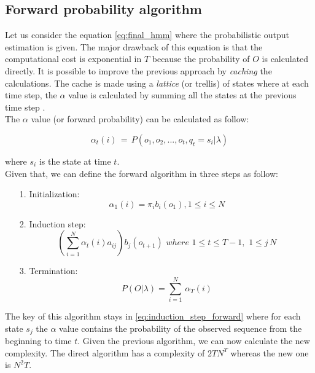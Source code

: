 \subsection{Forward probability algorithm}
Let us consider the equation \ref{eq:final_hmm} where the probabilistic output estimation is given. The major drawback of this equation is that the computational cost is exponential in $T$ because the probability of $O$ is calculated directly. It is possible to improve the previous approach by \textit{caching} the calculations. The cache is made using a \textit{lattice} (or trellis) of states where at each time step, the $\alpha$ value is calculated by summing all the states at the previous time step \cite{hmm_tutorial}. \\

\noindent The $\alpha$ value (or forward probability) can be calculated as follow:

\begin{equation}
\label{eq:alpha_equation}
	\alpha_{t}(i) \, = \, P(o_{1}, o_{2}, ... , o_{t}, q_{t} = s_{i} | \lambda)
\end{equation}

\noindent where $s_{i}$ is the state at time $t$. \\
Given that, we can define the forward algorithm in three steps as follow:

\begin{itemize}
	\item[1.]{Initialization:} \\
		\begin{equation}
			\alpha_{1}(i) = \pi_{i}b_{i}(o_{1}), 1 \leq i \leq N
		\end{equation}		
	\item[2.]{Induction step:} \\
		\begin{equation}
		\label{eq:induction_step_forward}
			\left ( \sum_{i=1}^{N} \alpha_{t}(i) a_{ij} \right ) b_{j}(o_{t+1}) \,\, where \,\, 1 \leq t \leq T - 1, \,\, 1 \leq j \, N
		\end{equation}		
	\item[3.]{Termination:} \\
		\begin{equation}
			P(O|\lambda) = \sum_{i=1}^{N} \, \alpha_{T}(i)
		\end{equation}
\end{itemize}
		
\noindent The key of this algorithm stays in \ref{eq:induction_step_forward} where for each state $s_{j}$ the $\alpha$ value contains the probability of the observed sequence from the beginning to time $t$. Given the previous algorithm, we can now calculate the new complexity. The direct algorithm has a complexity of $2TN^{T}$ whereas the new one is $N^{2}T$.

